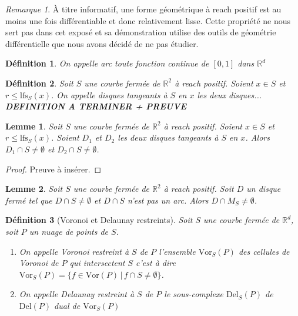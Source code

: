 \documentclass{report}
\newcommand{\R}{\mathbb{R}}
\newcommand{\Vor}{\mathrm{Vor}}
\newcommand{\Del}{\mathrm{Del}}
\newcommand{\lfs}{\mathrm{lfs}}
\newtheorem{definition}{Définition}
\newtheorem{lemma}{Lemme}
\theoremstyle{remark}
\newtheorem*{rmq}{Remarque}
\begin{document}
\begin{rmq}
	\`A titre informatif, une forme géométrique à reach positif est au moins une fois différentiable et donc relativement lisse. Cette propriété ne nous sert pas dans cet exposé et sa démonstration utilise des outils de géométrie différentielle que nous avons décidé de ne pas étudier.
\end{rmq}

\begin{definition}
	On appelle \textnormal{arc} toute fonction continue de $[0,1]$ dans $\R^d$
\end{definition}

\begin{definition}
	Soit $S$ une courbe fermée de $\R^2$ à reach positif. Soient $x\in S$ et $r\leq\lfs_S(x)$. On appelle \textnormal{disques tangeants à $S$ en $x$} les deux disques... \textbf{DEFINITION A TERMINER + PREUVE}
\end{definition}

\begin{lemma}
	Soit $S$ une courbe fermée de $\R^2$ à reach positif. Soient $x\in S$ et $r\leq\lfs_S(x)$. Soient $D_1$ et $D_2$ les deux disques tangeants à $S$ en $x$. Alors $D_1\cap S\neq\emptyset$ et $D_2\cap S\neq\emptyset$.
\end{lemma}

\begin{proof}
	Preuve à insérer.
\end{proof}

\begin{lemma}
	Soit $S$ une courbe fermée de $\R^2$ à reach positif. Soit $D$ un disque fermé tel que $D\cap S\neq\emptyset$ et $D\cap S$ n'est pas un arc. Alors $D\cap M_S\neq\emptyset$.
\end{lemma}

\begin{definition}[Voronoi et Delaunay restreints]
	Soit $S$ une courbe fermée de $\R^d$, soit $P$ un nuage de points de $S$. 
	\begin{enumerate}
		\item On appelle \textnormal{Voronoi restreint à $S$ de $P$} l'ensemble $\Vor_S(P)$ des cellules de Voronoi de $P$ qui intersectent $S$ c'est à dire $\Vor_S(P) = \{f\in\Vor(P)\,|\,f\cap S\neq\emptyset\}$. 
		\item On appelle \textnormal{Delaunay restreint à $S$ de $P$} le sous-complexe $\Del_S(P)$ de $\Del(P)$ dual de $\Vor_S(P)$
	\end{enumerate}
\end{definition}
\end{document}
